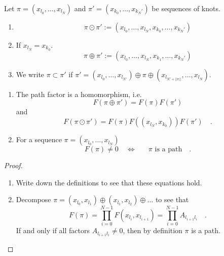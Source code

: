 \begin{definition}{}{}
	Let $\pi = (x_{l_0},\ldots,x_{l_N})$ and $\pi' = (x_{k_0},\ldots,x_{k_N'})$ be 
	sequences of knots.
	\begin{enumerate}
	\item 
	\begin{equation}
	\pi \odot \pi' := (x_{l_0},\ldots,x_{l_N},x_{k_0},\ldots,x_{k_N'})
	\end{equation}
	\item If $x_{l_N}=x_{k_0}$.
	\begin{equation}
	\pi \oplus \pi' := (x_{l_0},\ldots,x_{l_N},x_{k_1},\ldots,x_{k_N'})
	\end{equation}	
	\item
	We write 
	$\pi \subset \pi'$ if $\pi'=(x_{l_0},\ldots,x_{l_{N'}} ) \oplus \pi \oplus 
	(x_{l_{ N'+||\pi||} },\ldots,x_{l_N})$.
	\end{enumerate}
\end{definition}

\begin{lemma}{}{}
	\begin{enumerate}
	\item The path factor is a homomorphism, i.e. 
	\begin{equation}
	F(\pi\oplus \pi') = F(\pi) F(\pi') 
	\end{equation}	
	and 
	\begin{equation}
	F(\pi \odot \pi') = F(\pi) F( (x_{l_N},x_{k_0}))F(\pi') \quad . 
	\end{equation}
	\item For a sequence $\pi=(x_{l_0},\ldots,x_{l_N})$
	\begin{equation}
	F(\pi) \neq 0 \quad \Leftrightarrow \quad \text{ $\pi$ is a path} \quad .
	\end{equation}
	\end{enumerate}
\end{lemma}
\begin{proof}
	\begin{enumerate}
	\item
	Write down the definitions to see that these equations hold.
	\item
	Decompose $\pi = (x_{l_0},x_{l_1})\oplus (x_{l_1},x_{l_2})\oplus \ldots $ to see that 
	\begin{equation}
	F(\pi) = \prod\limits_{i=0}^{N-1} F(x_{l_{i}},x_{l_{i+1}}) = \prod\limits_{i=0}^{N-1}
	A_{l_{i+1}l_i} \quad .
	\end{equation}
	If and only if all factors $A_{l_{i+1}l_i}\neq 0$, then by definition $\pi$ is a path.
	\end{enumerate}
\end{proof}

